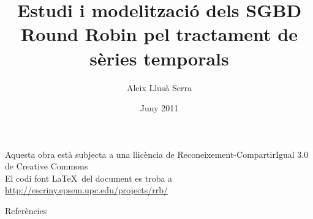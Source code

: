 \documentclass[catalan]{beamer}
\title%
   [SGBD Round Robin per a sèries temporals]%
   {Estudi i modelització dels SGBD Round Robin 
     pel tractament de sèries temporals}
\author[A. Llusà]{%
  Aleix Llusà Serra}
\institute[Màster Automàtica UPC]
{
  {\large Universitat Politècnica de Catalunya} \\
  Màster en Automàtica i Robòtica 
}
\date{Juny 2011}
\begin{document}
\begin{frame}
 \titlepage

 \begin{center}
  {\footnotesize \cc\bysa}
  {\tiny Aquesta obra està subjecta a una llicència de Reconeixement-CompartirIgual 3.0 de Creative Commons\\
    El codi font \LaTeX\ del document es troba a
    \url{http://escriny.epsem.upc.edu/projects/rrb/} 
  }
  \end{center}
\end{frame}













\begin{frame}[allowframebreaks]
{Referències}

\printbibliography

\end{frame}
\end{document}
